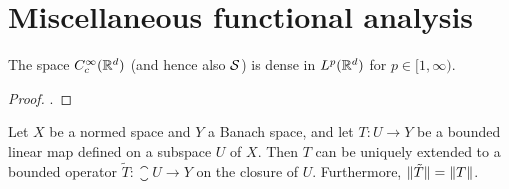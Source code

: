 \documentclass[article, a4paper, 11pt, oneside]{memoir}
\makeatletter
\numberwithin{equation}{chapter}
\theoremstyle{myexample}
\theoremstyle{myexample}
\theoremstyle{myexamplebreak}
\theoremstyle{myexamplebreak}
\theoremstyle{nonumberplain}
\newtheorem{proof}{\protect\@proof}
\theoremstyle{MyNonumberplain}
\newcommand{\@proof}{}
\renewcommand{\@proof}{Proof}%
\renewcommand{\@proof}{Bevis}%
\makeatother
\begin{document}




\chapter{Miscellaneous functional analysis}

\begin{proposition}
    \label{thm:smoothcpt_dense}
    The space $C^\infty_c(\mathbb{R}^d)$ (and hence also $\mathcal{S}$) is dense in $L^p(\mathbb{R}^d)$ for $p \in [1, \infty)$.
\end{proposition}

\begin{proof}
    \textcite[Proposition~8.17]{folland2007}.
\end{proof}



\begin{theorem}
     \label{thm:blt}
    Let $X$ be a normed space and $Y$ a Banach space, and let $T\colon U \to Y$ be a bounded linear map defined on a subspace $U$ of $X$. Then $T$ can be uniquely extended to a bounded operator $\tilde{T}\colon \closure{U} \to Y$ on the closure of $U$. Furthermore, $\lVert\tilde{T}\rVert = \lVert T\rVert$.
\end{theorem}
\end{document}

